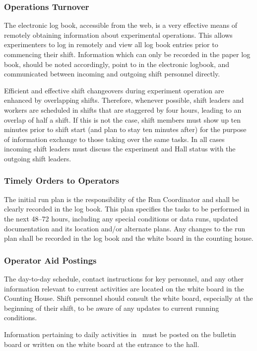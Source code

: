 \documentclass[10pt]{article}
\begin{document}
\subsubsection{Operations Turnover}
The electronic log book, accessible from the web, is a very effective means 
of remotely obtaining information about experimental operations. This allows 
experimenters to log in remotely and view all log book 
entries prior to commencing their shift.
Information which can only be recorded in the paper log book, should be
noted accordingly, point to in the electronic logbook, and communicated between incoming and outgoing shift 
personnel directly.

Efficient and effective shift changeovers during experiment operation 
are enhanced by overlapping shifts. Therefore, whenever possible, shift leaders 
and workers are scheduled in shifts that are staggered by four hours, leading 
to an overlap of half a shift.  If this is not the case, shift members must show
up ten minutes prior to shift start (and plan to stay ten minutes after) for the
purpose of information exchange to those taking over the same tasks.
In all cases incoming shift leaders must discuss the experiment and Hall status with the
outgoing shift leaders.

\subsubsection{Timely Orders to Operators}
The initial run plan is the responsibility of the Run Coordinator and
shall be clearly recorded in the log book. This plan specifies
the tasks to be performed in the next 48--72 hours, including
any special conditions or data runs, updated documentation and its
location and/or alternate plans. Any changes to the run plan shall
be recorded in the log book and the white board in the counting house.

\subsubsection{Operator Aid Postings}
The day-to-day schedule, contact instructions for key personnel, and 
any other information relevant to current activities are located
on the white board in the Counting House. Shift personnel should
consult the white board, especially at the beginning
of their shift, to be aware of any updates to current running conditions.

Information pertaining to daily activities in \HALL\ must be posted on the 
bulletin board or written on the white board at the entrance to the hall.
\end{document}
